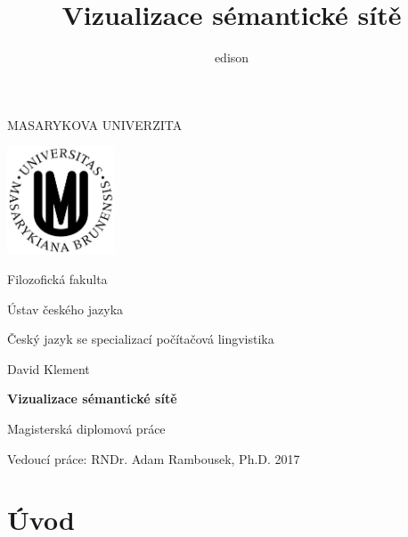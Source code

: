 \documentclass[a4paper, 11pt, oneside]{book}
\author{edison}
\title{Vizualizace sémantické sítě}
\begin{document}
	
	\dominitoc %
	
	\begin{titlepage}
		\begin{center}
			{\Large\uppercase{Masarykova univerzita}}

			\vspace{1em}

			\includegraphics[width=0.24\textwidth]{logo-muni.png}
			
			\vspace{2em}

			{\Large Filozofická fakulta}

			\vspace{1em}

			{\large Ústav českého jazyka}

			\vspace{1em}

			{\large Český jazyk se specializací počítačová lingvistika}

			\vspace{7em}

			{\Large David Klement}
			
			\vspace{5em}
			
			{\huge\bf Vizualizace sémantické sítě}

			\vspace{1.5em}

			{\Large Magisterská diplomová práce}

			\vfill
		\end{center}
		\begin{flushleft}
			Vedoucí práce: RNDr. Adam Rambousek, Ph.D. \hfill 2017
		\end{flushleft}
	\end{titlepage}

	\newpage

	{
		\tableofcontents
	}

	\newpage

	\chapter*{Úvod}\label{uvod}
\end{document}
